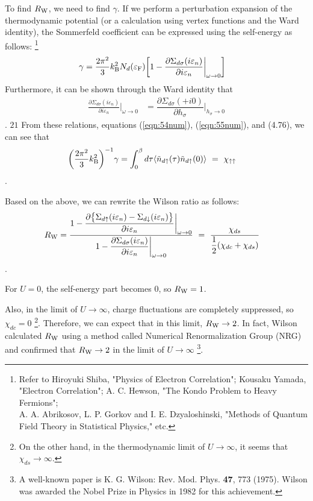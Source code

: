 \documentclass[a4j]{jarticle}
\begin{document}
To find $R_{\rm W}$, we need to find $\gamma$.
If we perform a perturbation expansion of the thermodynamic potential (or a calculation using vertex functions and the Ward identity), the Sommerfeld coefficient can be expressed using the self-energy as follows:
\footnote{
	Refer to Hiroyuki Shiba, "Physics of Electron Correlation";
	Kousaku Yamada, "Electron Correlation";
	A. C. Hewson, "The Kondo Problem to Heavy Fermions"; \\
	A. A. Abrikosov, L. P. Gorkov and I. E. Dzyaloshinski, "Methods of Quantum Field Theory in Statistical Physics," etc.
}
\begin{align}
	\gamma
	 & =
	\frac{2 \pi^{2}}{3}
	k_{\rm B}^{2}
	N_{d}(\varepsilon_{\rm F})
	\bigg[
		1
		-
		\frac{\partial \Sigma_{d \sigma} (i \varepsilon_{n}) }{\partial i \varepsilon_{n}}
		\bigg|_{\omega \to 0}
		\bigg]
	\label{eqn:54num}
\end{align}
Furthermore, it can be shown through the Ward identity that
\begin{align}
	\frac{\partial \Sigma_{d \sigma} (i \varepsilon_{n}) }{\partial i \varepsilon_{n}}
	\bigg|_{\omega \to 0}
	 & =
	\dfrac{\partial \Sigma_{d \sigma}(+i0)}{\partial h_{\sigma}}
	\bigg|_{h_{\sigma} \to 0}
	\label{eqn:55num}
\end{align}
. $21$
From these relations, equations (\ref{eqn:54num}), (\ref{eqn:55num}), and (4.76), we can see that
\begin{align}
	\bigg(
	\dfrac{2 \pi^{2}}{3}
	k_{\rm B}^{2}
	\bigg)^{-1}
	\gamma
	 & =
	\int^{\beta}_{0}d \tau
	\langle
	\tilde{n}_{d \uparrow}(\tau)
	\tilde{n}_{d \uparrow}(0)
	\rangle
	\ = \
	\chi_{\uparrow \uparrow}
\end{align}
.

Based on the above, we can rewrite the Wilson ratio as follows:
\begin{align}
	R_{\rm W}
	 & =
	\frac{
		1
		-
		\dfrac{\partial\big\{ \Sigma_{d \uparrow} (i \varepsilon_{n}) - \Sigma_{d \downarrow} (i \varepsilon_{n}) \big\} }{\partial i \varepsilon_{n} }
		\bigg|_{\omega \to 0}
	}{
		1
		-
		\dfrac{\partial \Sigma_{d \sigma} (i \varepsilon_{n}) }{\partial i \varepsilon_{n}}
		\bigg|_{\omega \to 0}
	}
	\ = \
	\frac{\chi_{ds} }{\dfrac{1}{2} ( \chi_{dc} + \chi_{ds} ) }
\end{align}
.

For $U=0$, the self-energy part becomes 0, so $R_{\rm W}=1$.

Also, in the limit of $U \to \infty$, charge fluctuations are completely suppressed, so $\chi_{dc}=0$
\footnote{
	On the other hand, in the thermodynamic limit of $U \to \infty$, it seems that $\chi_{ds} \to \infty$.
}.
Therefore, we can expect that in this limit, $R_{\rm W} \to 2$.
In fact, Wilson calculated $R_{\rm W}$ using a method called Numerical Renormalization Group (NRG) and confirmed that $R_{\rm W} \to 2$ in the limit of $U \to \infty$
\footnote{
	A well-known paper is K. G. Wilson: Rev. Mod. Phys. {\bf 47}, 773 (1975).
	Wilson was awarded the Nobel Prize in Physics in 1982 for this achievement.
}.
\end{document}
